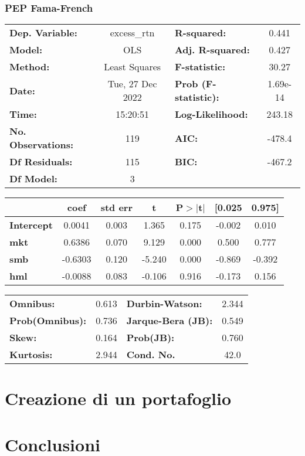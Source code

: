 \documentclass{report}
\begin{document}
\subsection{PEP Fama-French}

\begin{center}
\begin{tabular}{lclc}
\toprule
\textbf{Dep. Variable:}    &   excess\_rtn    & \textbf{  R-squared:         } &     0.441   \\
\textbf{Model:}            &       OLS        & \textbf{  Adj. R-squared:    } &     0.427   \\
\textbf{Method:}           &  Least Squares   & \textbf{  F-statistic:       } &     30.27   \\
\textbf{Date:}             & Tue, 27 Dec 2022 & \textbf{  Prob (F-statistic):} &  1.69e-14   \\
\textbf{Time:}             &     15:20:51     & \textbf{  Log-Likelihood:    } &    243.18   \\
\textbf{No. Observations:} &         119      & \textbf{  AIC:               } &    -478.4   \\
\textbf{Df Residuals:}     &         115      & \textbf{  BIC:               } &    -467.2   \\
\textbf{Df Model:}         &           3      & \textbf{                     } &             \\
\bottomrule
\end{tabular}
\begin{tabular}{lcccccc}
                   & \textbf{coef} & \textbf{std err} & \textbf{t} & \textbf{P$> |$t$|$} & \textbf{[0.025} & \textbf{0.975]}  \\
\midrule
\textbf{Intercept} &       0.0041  &        0.003     &     1.365  &         0.175        &       -0.002    &        0.010     \\
\textbf{mkt}       &       0.6386  &        0.070     &     9.129  &         0.000        &        0.500    &        0.777     \\
\textbf{smb}       &      -0.6303  &        0.120     &    -5.240  &         0.000        &       -0.869    &       -0.392     \\
\textbf{hml}       &      -0.0088  &        0.083     &    -0.106  &         0.916        &       -0.173    &        0.156     \\
\bottomrule
\end{tabular}
\begin{tabular}{lclc}
\textbf{Omnibus:}       &  0.613 & \textbf{  Durbin-Watson:     } &    2.344  \\
\textbf{Prob(Omnibus):} &  0.736 & \textbf{  Jarque-Bera (JB):  } &    0.549  \\
\textbf{Skew:}          &  0.164 & \textbf{  Prob(JB):          } &    0.760  \\
\textbf{Kurtosis:}      &  2.944 & \textbf{  Cond. No.          } &     42.0  \\
\bottomrule
\end{tabular}
\end{center}

\chapter{Creazione di un portafoglio}
\chapter{Conclusioni}
\tableofcontents
\end{document}
